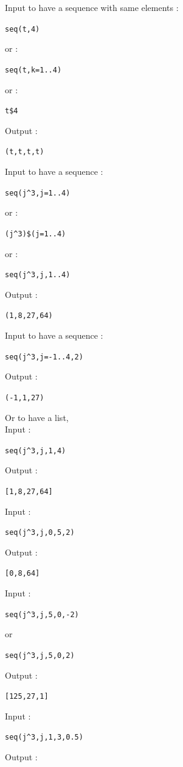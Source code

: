 \documentclass[a4paper,11pt]{book}
\begin{document}
Input to have a sequence with same elements :
\begin{center}{\tt seq(t,4)}\end{center}
or : 
\begin{center}{\tt seq(t,k=1..4)}\end{center}
or :
\begin{center}{\tt t\$4}\end{center} 
Output :
\begin{center}{\tt (t,t,t,t)}\end{center}
Input to have a sequence :
\begin{center}{\tt seq(j\verb|^|3,j=1..4)}\end{center}
or : 
\begin{center}{\tt (j\verb|^|3)\$(j=1..4)}\end{center} 
or :
\begin{center}{\tt seq(j\verb|^|3,j,1..4)}\end{center}
Output :
\begin{center}{\tt (1,8,27,64)}\end{center}
Input to have a sequence :
\begin{center}{\tt seq(j\verb|^|3,j=-1..4,2)}\end{center}
Output :
\begin{center}{\tt (-1,1,27)}\end{center}
Or to have a list,\\
Input :
\begin{center}{\tt seq(j\verb|^|3,j,1,4)}\end{center}
Output :
\begin{center}{\tt [1,8,27,64]}\end{center}
Input :
\begin{center}{\tt seq(j\verb|^|3,j,0,5,2)}\end{center}
Output :
\begin{center}{\tt [0,8,64]}\end{center}
Input :
\begin{center}{\tt seq(j\verb|^|3,j,5,0,-2)}\end{center}
or
\begin{center}{\tt seq(j\verb|^|3,j,5,0,2)}\end{center}
Output :
\begin{center}{\tt [125,27,1]}\end{center}
Input :
\begin{center}{\tt seq(j\verb|^|3,j,1,3,0.5)}\end{center}
Output :
\end{document}
